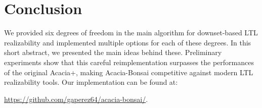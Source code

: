 \documentclass[runningheads,a4paper,draft]{llncs}
\begin{document}
\section{Conclusion}

We provided six degrees of freedom in the main algorithm for downset-based LTL
realizability and implemented multiple options for each of these degrees.  In
this short abstract, we presented the main ideas behind these.  Preliminary
experiments show that this careful reimplementation surpasses the performances
of the original Acacia+, making Acacia-Bonsai competitive against modern LTL
realizability tools. Our implementation can be found at:
\begin{center}
\url{https://github.com/gaperez64/acacia-bonsai/}.
\end{center}



\end{document}
